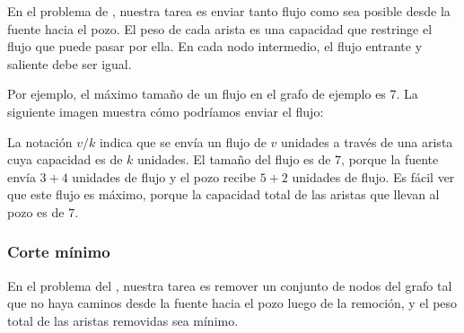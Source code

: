 
En el problema de , nuestra tarea es enviar tanto
flujo como sea posible desde la fuente hacia el pozo. El peso de cada
arista es una capacidad que restringe el flujo que puede pasar por ella.
En cada nodo intermedio, el flujo entrante y saliente debe ser igual.

Por ejemplo, el máximo tamaño de un flujo en el grafo de ejemplo es 7.
La siguiente imagen muestra cómo podríamos enviar el flujo:

\begin{center}
\end{center}

La notación $v/k$ indica que se envía un flujo de $v$ unidades
a través de una arista cuya capacidad es de $k$ unidades. El tamaño
del flujo es de $7$, porque la fuente envía $3+4$ unidades de flujo
y el pozo recibe $5+2$ unidades de flujo. Es fácil ver que este
flujo es máximo, porque la capacidad total de las aristas que llevan
al pozo es de $7$.

\subsubsection{Corte mínimo}


En el problema del , nuestra tarea es remover un
conjunto de nodos del grafo tal que no haya caminos desde la fuente
hacia el pozo luego de la remoción, y el peso total de las aristas
removidas sea mínimo.

